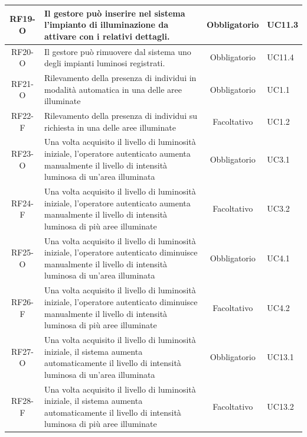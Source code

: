 \documentclass[a4paper, 12pt]{article}
\begin{document}
\begin{longtable}{|c|p{7cm}|c|p{4cm}|}
    \hline
    RF19-O          & Il gestore può inserire nel sistema l'impianto di illuminazione da attivare con i relativi dettagli.                                                          & Obbligatorio       & UC11.3         \\
    \hline
    RF20-O          & Il gestore può rimuovere dal sistema uno degli impianti luminosi registrati.                                                                                  & Obbligatorio       & UC11.4         \\
    \hline
    RF21-O          & Rilevamento della presenza di individui in modalità automatica in una delle aree illuminate                                                                   & Obbligatorio       & UC1.1          \\
    \hline
    RF22-F          & Rilevamento della presenza di individui su richiesta in una delle aree illuminate                                                                             & Facoltativo        & UC1.2          \\
    \hline
    RF23-O          & Una volta acquisito il livello di luminosità iniziale, l'operatore autenticato aumenta manualmente il livello di intensità luminosa di un'area illuminata     & Obbligatorio       & UC3.1          \\
    \hline
    RF24-F          & Una volta acquisito il livello di luminosità iniziale, l'operatore autenticato aumenta manualmente il livello di intensità luminosa di più aree illuminate    & Facoltativo        & UC3.2          \\
    \hline
    RF25-O          & Una volta acquisito il livello di luminosità iniziale, l'operatore autenticato diminuisce manualmente il livello di intensità luminosa di un'area illuminata  & Obbligatorio       & UC4.1          \\
    \hline
    RF26-F          & Una volta acquisito il livello di luminosità iniziale, l'operatore autenticato diminuisce manualmente il livello di intensità luminosa di più aree illuminate & Facoltativo        & UC4.2          \\
    \hline
    RF27-O          & Una volta acquisito il livello di luminosità iniziale, il sistema aumenta automaticamente il livello di intensità luminosa di un'area illuminata              & Obbligatorio       & UC13.1         \\
    \hline
    RF28-F          & Una volta acquisito il livello di luminosità iniziale, il sistema aumenta automaticamente il livello di intensità luminosa di più aree illuminate             & Facoltativo        & UC13.2         \\

\end{longtable}
\end{document}
